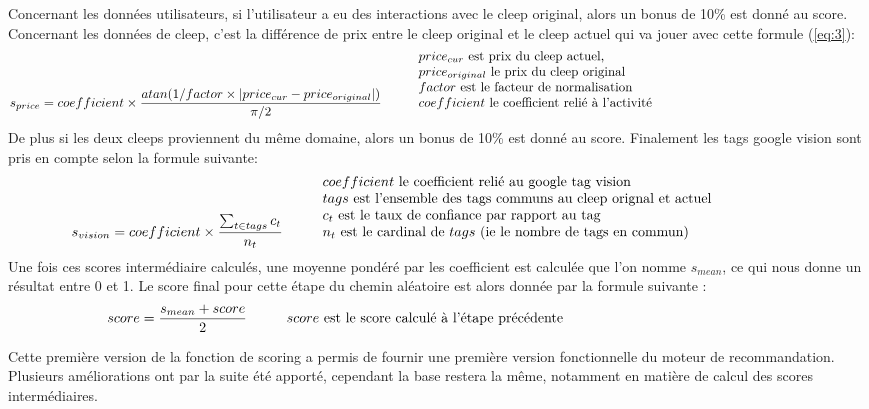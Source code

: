 \documentclass{article} %
\begin{document}
Concernant les données utilisateurs, si l'utilisateur a eu des interactions avec le cleep original, alors un bonus de 10\% est donné au score.\\

Concernant les données de cleep, c'est la différence de prix entre le cleep original et le cleep actuel qui va jouer avec cette formule (\ref{eq:3}):
\begin{equation}
\label{eq:3}
s_{price} = coefficient\times\frac{atan(1/factor \times |price_{cur} - price_{original}| )}{\pi/2} \hspace{1cm} \mbox{\vbox{\noindent $price_{cur}$ est prix du cleep actuel,\\ $price_{original}$ le prix du cleep original \\ $factor$ est le facteur de normalisation \\ $coefficient$ le coefficient relié à l'activité}}
\end{equation}
De plus si les deux cleeps proviennent du même domaine, alors un bonus de 10\% est donné au score. Finalement les tags google vision sont pris en compte selon la formule suivante:
\begin{equation}
\label{eq:4}
s_{vision} = coefficient\times \frac{\sum_{t \in tags}c_{t}}{n_{t}}
\hspace{1cm} \mbox{\vbox{\noindent $coefficient$ le coefficient relié au google tag vision\\
$tags$ est l'ensemble des tags communs au cleep orignal et actuel\\
$c_{t}$ est le taux de confiance par rapport au tag\\
$n_{t}$ est le cardinal de $tags$ (ie le nombre de tags en commun)}}
\end{equation}
\newpage
Une fois ces scores intermédiaire calculés, une moyenne pondéré par les coefficient est calculée que l'on nomme $s_{mean}$, ce qui nous donne un résultat entre 0 et 1. Le score final pour cette étape du chemin aléatoire est alors donnée par la formule suivante :
\begin{equation}
\label{eq:4}
score = \frac{s_{mean} + score}{2}
\hspace{1cm} \mbox{\vbox{\noindent $score$ est le score calculé à l'étape précédente}}
\end{equation}

Cette première version de la fonction de scoring a permis de fournir une première version fonctionnelle du moteur de recommandation. Plusieurs améliorations ont par la suite été apporté, cependant la base restera la même, notamment en matière de calcul des scores intermédiaires.
\end{document}
